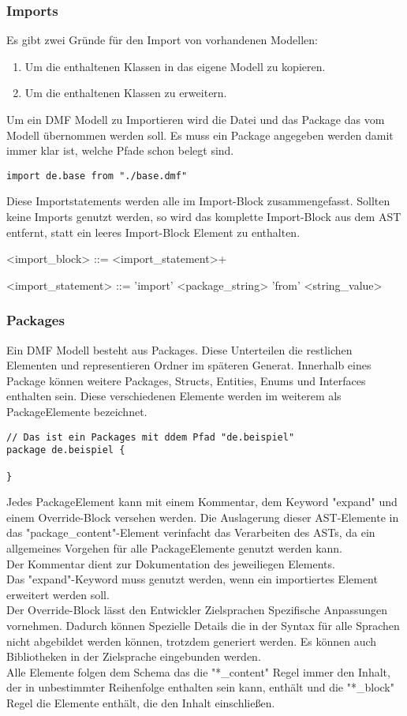 \documentclass[./einleitung.tex]{subfiles}
\begin{document}
\subsubsection{Imports}
Es gibt zwei Gründe für den Import von vorhandenen Modellen:
\begin{enumerate}
\item Um die enthaltenen Klassen in das eigene Modell zu kopieren.
\item Um die enthaltenen Klassen zu erweitern.
\end{enumerate}
Um ein DMF Modell zu Importieren wird die Datei und das Package das vom Modell übernommen werden soll. Es muss ein Package angegeben werden damit immer klar ist, welche Pfade schon belegt sind.
\begin{lstlisting}[caption={Import des Package de.base}]
import de.base from "./base.dmf"
\end{lstlisting}
Diese Importstatements werden alle im Import-Block zusammengefasst. Sollten keine Imports genutzt werden, so wird das komplette Import-Block aus dem AST entfernt, statt ein leeres Import-Block Element zu enthalten.
\begin{grammar}
<import_block> ::= <import_statement>+

<import_statement> ::= 'import' <package_string> 'from' <string_value>
\end{grammar}

\subsubsection{Packages}
Ein DMF Modell besteht aus Packages. Diese Unterteilen die restlichen Elementen und representieren Ordner im späteren Generat.
Innerhalb eines Package können weitere Packages, Structs, Entities, Enums und Interfaces enthalten sein. Diese verschiedenen Elemente werden im weiterem als PackageElemente bezeichnet.\\
\begin{lstlisting}
// Das ist ein Packages mit ddem Pfad "de.beispiel"
package de.beispiel {

}
\end{lstlisting}
Jedes PackageElement kann mit einem Kommentar, dem Keyword "expand" und einem Override-Block versehen werden.
Die Auslagerung dieser AST-Elemente in das "package_content"-Element verinfacht das Verarbeiten des ASTs, da ein allgemeines Vorgehen für alle PackageElemente genutzt werden kann.\\
Der Kommentar dient zur Dokumentation des jeweiliegen Elements. \\
Das "expand"-Keyword muss genutzt werden, wenn ein importiertes Element erweitert werden soll. \\
Der Override-Block lässt den Entwickler Zielsprachen Spezifische Anpassungen vornehmen. Dadurch können Spezielle Details die in der Syntax für alle Sprachen nicht abgebildet werden können, trotzdem generiert werden. Es können auch Bibliotheken in der Zielsprache eingebunden werden. \\
Alle Elemente folgen dem Schema das die "*_content" Regel immer den Inhalt, der in unbestimmter Reihenfolge enthalten sein kann, enthält und die "*_block" Regel die Elemente enthält, die den Inhalt einschließen.
\end{document}
